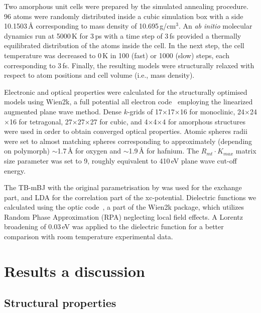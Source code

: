 \documentclass[10pt,a4paper,twocolumn]{article}
\begin{document}
Two amorphous unit cells were prepared by the simulated annealing procedure.
96 atoms were randomly distributed inside a cubic simulation box with a side 10.1503\,\AA{} corresponding to mass density of 10.695\,g/cm$^3$.
An \textit{ab initio} molecular dynamics run at 5000\,K for 3\,ps with a time step of 3\,fs provided a thermally equilibrated distribution of the atoms inside the cell.
In the next step, the cell temperature was decreased to 0\,K in 100 (fast) or 1000 (slow) steps, each corresponding to 3\,fs.
Finally, the resulting models were structurally relaxed with respect to atom positions and cell volume (i.e., mass density).

Electronic and optical properties were calculated for the structurally optimised models using Wien2k, a full potential all electron code~\cite{Blaha2001} employing the linearized augmented plane wave method.
Dense $k$-grids of 17$\times$17$\times$16 for monoclinic, 24$\times$24$\times$16 for tetragonal, 27$\times$27$\times$27 for cubic, and 4$\times$4$\times$4 for amorphous structures were used in order to obtain converged optical properties.
Atomic spheres radii were set to almost matching spheres corresponding to approximately (depending on polymorph) $\sim$1.7\,\AA{} for oxygen and $\sim$1.9\,\AA{} for hafnium.
The $R_{mt} \cdot K_{max}$ matrix size parameter was set to 9, roughly equivalent to 410\,eV plane wave cut-off energy.

The TB-mBJ with the original parametrisation by \citet{Tran2009} was used for the exchange part, and LDA for the correlation part of the xc-potential. Dielectric functions we calculated using the optic code~\cite{AmbroschDraxl2006}, a part of the Wien2k package, which utilizes Random Phase Approximation (RPA) neglecting local field effects.
A Lorentz broadening of 0.03\,eV was applied to the dielectric function for a better comparison with room temperature experimental data.

\section{Results a discussion}

\subsection{Structural properties}
\end{document}
